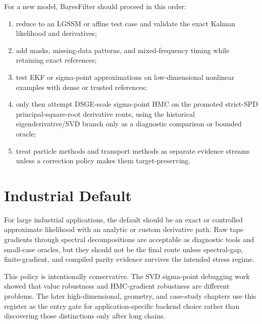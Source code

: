 For a new model, BayesFilter should proceed in this order:
\begin{enumerate}[label=(\roman*)]
  \item reduce to an LGSSM or affine test case and validate the exact Kalman
    likelihood and derivatives;
  \item add masks, missing-data patterns, and mixed-frequency timing while
    retaining exact references;
  \item test EKF or sigma-point approximations on low-dimensional nonlinear
    examples with dense or trusted references;
  \item only then attempt DSGE-scale sigma-point HMC on the promoted strict-SPD principal-square-root derivative route, using the historical eigenderivative/SVD branch only as a diagnostic comparison or bounded oracle;
  \item treat particle methods and transport methods as separate evidence
    streams unless a correction policy makes them target-preserving.
\end{enumerate}

\section{Industrial Default}
\label{sec:bf-filter-choice-industrial-default}

For large industrial applications, the default should be an exact or controlled
approximate likelihood with an analytic or custom derivative path.  Raw tape
gradients through spectral decompositions are acceptable as diagnostic tools and
small-case oracles, but they should not be the final route unless spectral-gap,
finite-gradient, and compiled parity evidence survives the intended stress
regime.

This policy is intentionally conservative.  The SVD sigma-point debugging work
showed that value robustness and HMC-gradient robustness are different
problems.  The later high-dimensional, geometry, and case-study chapters use this register as the
entry gate for application-specific backend choice rather than discovering those
distinctions only after long chains.
